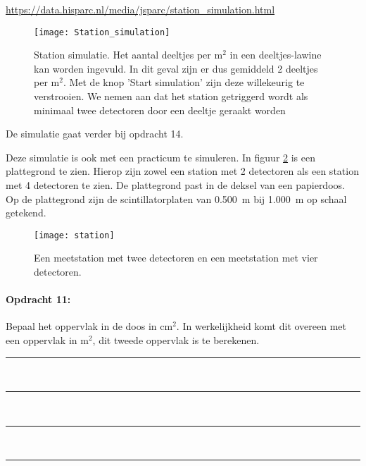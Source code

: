 \url{https://data.hisparc.nl/media/jsparc/station_simulation.html}

\begin{figure}[H]
\texttt{[image: Station\_simulation]}

\caption{\label{fig:Station_simulatie}Station simulatie. Het aantal deeltjes
per m$^{2}$ in een deeltjes-lawine kan worden ingevuld. In dit geval zijn er
dus gemiddeld 2 deeltjes per m$^{2}$. Met de knop 'Start simulation' zijn deze
willekeurig te verstrooien. We nemen aan dat het station getriggerd wordt als
minimaal twee detectoren door een deeltje geraakt worden}

\end{figure}


De simulatie gaat verder bij opdracht 14.

Deze simulatie is ook met een practicum te simuleren. In
figuur \ref{fig:Meetstations} is een plattegrond te zien. Hierop
zijn zowel een station met 2 detectoren als een station met 4 detectoren
te zien. De plattegrond past in de deksel van een papierdoos. Op de
plattegrond zijn de scintillatorplaten van \SI{0.500}{\meter} bij
\SI{1.000}{\meter} op schaal getekend.

\begin{figure}[h]
    \centering
    \texttt{[image: station]}
    \caption{Een meetstation met twee detectoren en een
    meetstation met vier detectoren.}
    \label{fig:Meetstations}
\end{figure}

\begin{minipage}[t]{\columnwidth}%

\paragraph{Opdracht 11:}

Bepaal het oppervlak in de doos in $\mathrm{cm^{2}}$. In
werkelijkheid komt dit overeen met een oppervlak in $\mathrm{m^{2}}$,
dit tweede oppervlak is te berekenen.

\begin{center}
    \rule{\textwidth}{0.3mm}\\
    \rule{\textwidth}{0.3mm}\\
    \rule{\textwidth}{0.3mm}\\
    \rule{\textwidth}{0.3mm}\\
\end{center}
\end{minipage}\bigskip{}

